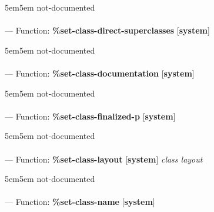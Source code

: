 \begin{adjustwidth}{5em}{5em}
not-documented
\end{adjustwidth}

\paragraph{}
\label{SYSTEM:SET-CLASS-DIRECT-SUPERCLASSES}
--- Function: \textbf{\%set-class-direct-superclasses} [\textbf{system}] \textit{}

\begin{adjustwidth}{5em}{5em}
not-documented
\end{adjustwidth}

\paragraph{}
\label{SYSTEM:SET-CLASS-DOCUMENTATION}
--- Function: \textbf{\%set-class-documentation} [\textbf{system}] \textit{}

\begin{adjustwidth}{5em}{5em}
not-documented
\end{adjustwidth}

\paragraph{}
\label{SYSTEM:SET-CLASS-FINALIZED-P}
--- Function: \textbf{\%set-class-finalized-p} [\textbf{system}] \textit{}

\begin{adjustwidth}{5em}{5em}
not-documented
\end{adjustwidth}

\paragraph{}
\label{SYSTEM:SET-CLASS-LAYOUT}
--- Function: \textbf{\%set-class-layout} [\textbf{system}] \textit{class layout}

\begin{adjustwidth}{5em}{5em}
not-documented
\end{adjustwidth}

\paragraph{}
\label{SYSTEM:SET-CLASS-NAME}
--- Function: \textbf{\%set-class-name} [\textbf{system}] \textit{}

